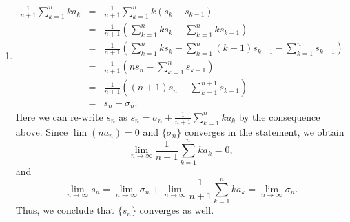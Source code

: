 \documentclass[a4paper]{article}
\theoremstyle{plain}
\begin{document}
\begin{enumerate}[label = (\alph*)]
    \item 
        \[
            \begin{array}{RCL}
                \frac{1}{n+1}\sum^n_{k=1}ka_k & = & \frac{1}{n+1}\sum^n_{k=1}k(s_k-s_{k-1}) \\[4mm]
                & = & \frac{1}{n+1}\left(\sum^n_{k=1}ks_k - \sum^n_{k=1}ks_{k-1}\right) \\[4mm]
                & = & \frac{1}{n+1}\left(\sum^n_{k=1}ks_k - \sum^n_{k=1}(k-1)s_{k-1} - \sum^n_{k=1}s_{k-1}\right) \\[4mm]
                & = & \frac{1}{n+1}\left(ns_n - \sum^n_{k=1}s_{k-1}\right) \\[4mm]
                & = & \frac{1}{n+1}\left((n+1)s_n - \sum^{n+1}_{k=1}s_{k-1}\right) \\[4mm]
                & = & s_n - \sigma_n.
            \end{array}
        \]
        Here we can re-write $s_n$ as $s_n = \sigma_n + \frac{1}{n+1}\sum^n_{k=1}ka_k$ by the consequence above.
        Since $\lim(na_n)=0$ and $\{\sigma_n\}$ converges in the statement, we obtain
        \[
            \lim_{n\to\infty}\frac{1}{n+1}\sum^n_{k=1}ka_k = 0,
        \]
        and 
        \[
            \lim_{n\to\infty}s_n = \lim_{n\to\infty}\sigma_n + \lim_{n\to\infty}\frac{1}{n+1}
            \sum^n_{k=1}ka_k = \lim_{n\to\infty}\sigma_n.
        \]
        Thus, we conclude that $\{s_n\}$ converges as well.


\end{enumerate}
\end{document}
